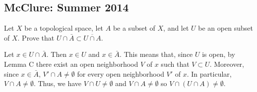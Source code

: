 \subsection{McClure: Summer 2014}
\setcounter{exercise}{0}
\begin{problem}
  Let $X$ be a topological space, let $A$ be a subset of $X$, and let $U$
  be an open subset of $X$. Prove that
  $U\cap \bar A\subset\overline{U\cap A}$.
\end{problem}
\begin{solution}
  Let $x\in U\cap\bar A$. Then $x\in U$ and $x\in\bar A$. This means that,
  since $U$ is open, by Lemma C there exist an open neighborhood $V$ of $x$
  such that $V\subset U$. Moreover, since $x\in\bar A$,
  $V'\cap A\neq\emptyset$ for every open neighborhood $V'$ of $x$. In
  particular, $V\cap A\neq\emptyset$. Thus, we have $V\cap U\neq\emptyset$
  and $V\cap A\neq\emptyset$ so $V\cap(U\cap A)\neq\emptyset$.
\end{solution}

